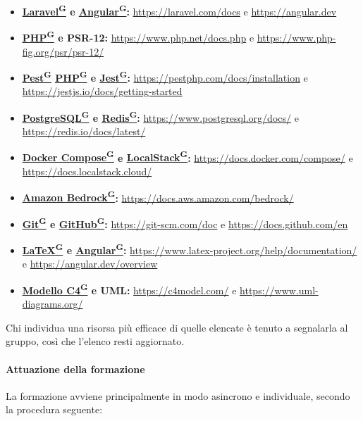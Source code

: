 \documentclass[a4paper,12pt]{article}
\providecommand{\glslink}[2]{\href{https://alittlebyte-19.github.io/Documentazione/glossario.html\#gls-#1}{\underline{#2}\textsuperscript{\scriptsize G}}}
\begin{document}
\begin{itemize}
    \item \textbf{\glslink{laravel}{Laravel} e \glslink{angular}{Angular}:} \url{https://laravel.com/docs} e \url{https://angular.dev}
    \item \textbf{\glslink{php}{PHP} e PSR-12:} \url{https://www.php.net/docs.php} e \url{https://www.php-fig.org/psr/psr-12/}
    \item \textbf{\glslink{pest}{Pest} \glslink{php}{PHP} e \glslink{jest}{Jest}:} \url{https://pestphp.com/docs/installation} e \url{https://jestjs.io/docs/getting-started}
    \item \textbf{\glslink{postgresql}{PostgreSQL} e \glslink{redis}{Redis}:} \url{https://www.postgresql.org/docs/} e \url{https://redis.io/docs/latest/}
    \item \textbf{\glslink{docker-compose}{Docker Compose} e \glslink{localstack}{LocalStack}:} \url{https://docs.docker.com/compose/} e \url{https://docs.localstack.cloud/}
    \item \textbf{\glslink{amazon-bedrock}{Amazon Bedrock}:} \url{https://docs.aws.amazon.com/bedrock/}
    \item \textbf{\glslink{git}{Git} e \glslink{github}{GitHub}:} \url{https://git-scm.com/doc} e \url{https://docs.github.com/en}
    \item \textbf{\glslink{latex}{LaTeX} e \glslink{angular}{Angular}:} \url{https://www.latex-project.org/help/documentation/} e \url{https://angular.dev/overview}
    \item \textbf{\glslink{modello-c4}{Modello C4} e UML:} \url{https://c4model.com/} e \url{https://www.uml-diagrams.org/}
\end{itemize}

Chi individua una risorsa più efficace di quelle elencate è tenuto a segnalarla al gruppo, così che l'elenco resti aggiornato.

\paragraph{Attuazione della formazione}
La formazione avviene principalmente in modo asincrono e individuale, secondo la procedura seguente:
\end{document}
